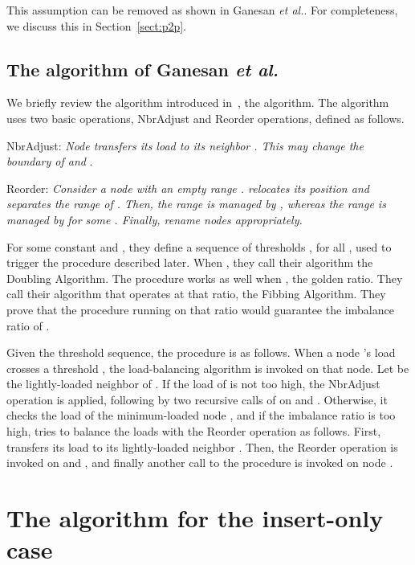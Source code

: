 \documentclass[a4paper]{article}
\begin{document}
This assumption can be removed as shown in Ganesan {\em et al.}.  For
completeness, we discuss this in Section~\ref{sect:p2p}.

\subsection{The algorithm of Ganesan {\em et al.}}
\label{sect:GBGM}

We briefly review the algorithm introduced
in~\cite{GanesanBGM04-vldb}, the {\adjload} algorithm. The algorithm
uses two basic operations, {\sc NbrAdjust} and {\sc Reorder}
operations, defined as follows.

{\sc NbrAdjust}: \textit{Node  transfers its load to its neighbor
  . This may change the boundary  of  and
  }.

{\sc Reorder}: \textit{ Consider a node  with an empty range
  .   relocates its position and
  separates the range of .  Then, the range  is managed by , whereas the range  is managed by  for some . Finally, rename nodes appropriately.}

For some constant  and , they define a sequence of
thresholds , for all , used to trigger the {\adjload} procedure described later.  When
, they call their algorithm the Doubling Algorithm.  
The {\adjload} procedure works as well when , the golden
ratio. They call their algorithm that operates at that ratio, the
Fibbing Algorithm. They prove that the {\adjload} procedure running on that ratio
would guarantee the imbalance ratio  of .

Given the threshold sequence, the {\adjload} procedure is as follows. When
a node 's load crosses a threshold , the load-balancing
algorithm is invoked on that node. Let  be the lightly-loaded
neighbor of . If the load of  is not too high, the {\sc
  NbrAdjust} operation is applied, following by two recursive calls of 
{\adjload} on  and . Otherwise, it checks the load of the
minimum-loaded node , and if the imbalance ratio is too high, tries to balance the
loads with the {\sc Reorder} operation as follows.
First,  transfers its load to its lightly-loaded neighbor .
Then, the {\sc Reorder} operation is invoked on  and , and
finally another call to the {\adjload} procedure is invoked on node .





\section{The algorithm for the insert-only case}
\label{sect:algorithm-insertonly}
\end{document}
